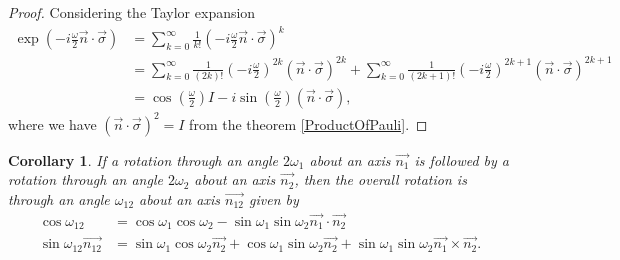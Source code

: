 \documentclass[a4paper,10pt]{book}
\newtheorem{corollary}[theorem]{Corollary}
\numberwithin{equation}{section}
\begin{document}
\begin{proof}
    Considering the Taylor expansion
    \begin{equation}
        \begin{split}
            \exp\left(-i\frac{\omega}{2}\vec{n}\cdot\vec{\sigma}\right)
             & = \sum_{k=0}^{\infty}\frac{1}{k!}\left(-i\frac{\omega}{2}\vec{n}\cdot\vec{\sigma}\right)^{k}                                                                                                                          \\
             & = \sum_{k=0}^{\infty}\frac{1}{(2k)!}\left(-i\frac{\omega}{2}\right)^{2k}(\vec{n}\cdot\vec{\sigma})^{2k} + \sum_{k=0}^{\infty}\frac{1}{(2k+1)!}\left(-i\frac{\omega}{2}\right)^{2k+1}(\vec{n}\cdot\vec{\sigma})^{2k+1} \\
             & = \cos \left(\frac{\omega}{2}\right)I-i\sin \left(\frac{\omega}{2}\right)(\vec{n}\cdot\vec{\sigma}),
        \end{split}
    \end{equation}
    where we have $(\vec{n}\cdot\vec{\sigma})^{2} = I$ from the theorem \ref{ProductOfPauli}.
\end{proof}
\begin{corollary}
    If a rotation through an angle $2\omega_{1}$ about an axis $\vec{n_{1}}$ is followed by a rotation through an angle $2\omega_{2}$ about an axis $\vec{n_{2}}$, then the overall rotation is through an angle $\omega_{12}$ about an axis $\vec{n_{12}}$ given by
    \begin{equation*}
        \begin{split}
            \cos\omega_{12}             & = \cos\omega_{1}\cos\omega_{2}-\sin\omega_{1}\sin\omega_{2}\vec{n_{1}}\cdot\vec{n_{2}}                                                      \\
            \sin\omega_{12}\vec{n_{12}} & = \sin\omega_{1}\cos\omega_{2}\vec{n_{2}}+\cos\omega_{1}\sin\omega_{2}\vec{n_{2}}+\sin\omega_{1}\sin\omega_{2}\vec{n_{1}}\times\vec{n_{2}}.
        \end{split}
    \end{equation*}
\end{corollary}
\end{document}
